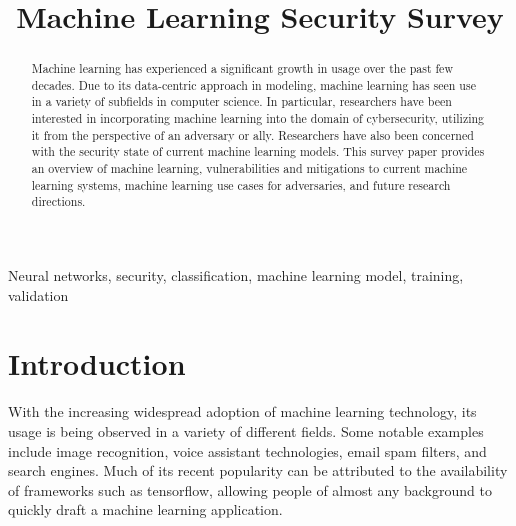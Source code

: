 \documentclass[11pt,conference]{IEEEtran}
\begin{document}
\title{Machine Learning Security Survey \\
}

\author{
}

\maketitle

\begin{abstract}
Machine learning has experienced a significant growth in usage 
over the past few decades. Due to its data-centric approach in modeling, 
machine learning has seen use in a variety of subfields in computer science. In
particular, researchers have been interested in incorporating machine learning
into the domain of cybersecurity, utilizing it from the perspective of an
adversary or ally. Researchers have also been concerned with the security state
of current machine learning models. This survey paper provides an overview of
machine learning, vulnerabilities and mitigations to current machine learning
    systems, machine learning use cases for adversaries, and future research
    directions.
\end{abstract}

\begin{IEEEkeywords}
Neural networks, security, classification, machine learning model, training,
    validation
\end{IEEEkeywords}

\section{Introduction}
With the increasing widespread adoption of machine learning technology, its
usage is being observed in a variety of different fields. Some notable examples
include image recognition, voice assistant technologies, email spam filters, and search
engines. Much of its recent popularity can be attributed to the availability of
frameworks such as tensorflow, allowing people of almost any background to
quickly draft a machine learning application.
\end{document}
